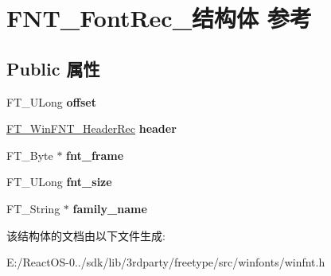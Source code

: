 \hypertarget{struct_f_n_t___font_rec__}{}\section{F\+N\+T\+\_\+\+Font\+Rec\+\_\+结构体 参考}
\label{struct_f_n_t___font_rec__}
\subsection*{Public 属性}
\begin{DoxyCompactItemize}
\item 
\mbox{\label{struct_f_n_t___font_rec___a3b31b101f35ed05e36c0437f5914aae1}} 
F\+T\+\_\+\+U\+Long {\bfseries offset}
\item 
\mbox{\label{struct_f_n_t___font_rec___a076defc551b80ac0ff29293e5ab1dc8f}} 
\hyperlink{struct_f_t___win_f_n_t___header_rec__}{F\+T\+\_\+\+Win\+F\+N\+T\+\_\+\+Header\+Rec} {\bfseries header}
\item 
\mbox{\label{struct_f_n_t___font_rec___a527defd5af4e48d8e8c6a5cedfd90367}} 
F\+T\+\_\+\+Byte $\ast$ {\bfseries fnt\+\_\+frame}
\item 
\mbox{\label{struct_f_n_t___font_rec___a8266ca89039c7441c371e5dcaf8238eb}} 
F\+T\+\_\+\+U\+Long {\bfseries fnt\+\_\+size}
\item 
\mbox{\label{struct_f_n_t___font_rec___afd7f3743ff327c0e9a9990086bbc3541}} 
F\+T\+\_\+\+String $\ast$ {\bfseries family\+\_\+name}
\end{DoxyCompactItemize}


该结构体的文档由以下文件生成\+:\begin{DoxyCompactItemize}
\item 
E\+:/\+React\+O\+S-\/0../sdk/lib/3rdparty/freetype/src/winfonts/winfnt.\+h\end{DoxyCompactItemize}
